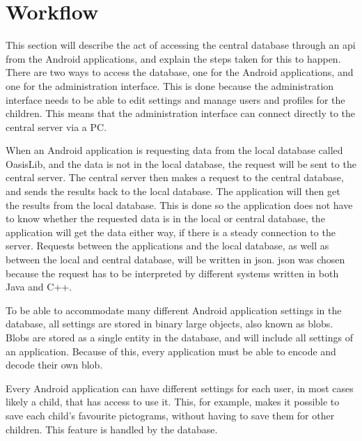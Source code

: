 \section{Workflow}
This section will describe the act of accessing the central database through an \ac{api} from the Android applications, and explain the steps taken for this to happen. There are two ways to access the database, one for the Android applications, and one for the administration interface. This is done because the administration interface needs to be able to edit settings and manage users and profiles for the children. This means that the administration interface can connect directly to the central server via a PC.

When an Android application is requesting data from the local database called OasisLib, and the data is not in the local database, the request will be sent to the central server. The central server then makes a request to the central database, and sends the results back to the local database. The application will then get the results from the local database. This is done so the application does not have to know whether the requested data is in the local or central database, the application will get the data either way, if there is a steady connection to the server. Requests between the applications and the local database, as well as between the local and central database, will be written in \ac{json}. \ac{json} was chosen because the request has to be interpreted by different systems written in both Java and C++.

To be able to accommodate many different Android application settings in the database, all settings are stored in binary large objects, also known as blobs. Blobs are stored as a single entity in the database, and will include all settings of an application. Because of this, every application must be able to encode and decode their own blob.

Every Android application can have different settings for each user, in most cases likely a child, that has access to use it. This, for example, makes it possible to save each child's favourite pictograms, without having to save them for other children. This feature is handled by the database.
